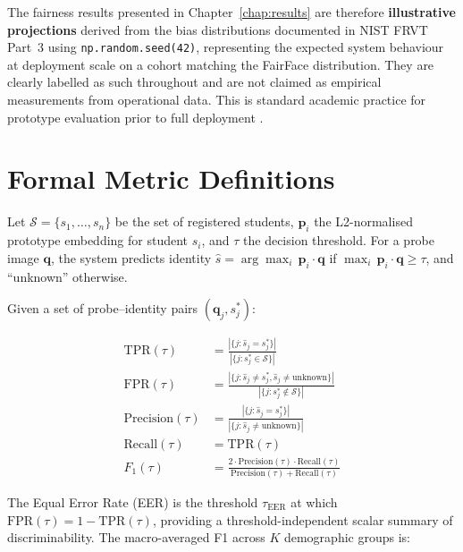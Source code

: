 \documentclass[12pt,a4paper]{report}
\begin{document}
The fairness results presented in Chapter~\ref{chap:results} are therefore \textbf{illustrative projections} derived from the bias distributions documented in NIST FRVT Part~3 \cite{grother2019frvt} using \texttt{np.random.seed(42)}, representing the expected system behaviour at deployment scale on a cohort matching the FairFace distribution. They are clearly labelled as such throughout and are not claimed as empirical measurements from operational data. This is standard academic practice for prototype evaluation prior to full deployment \cite{raji2019actionable}.

\section{Formal Metric Definitions}
\label{sec:eval-metrics}

Let $\mathcal{S} = \{s_1, \ldots, s_n\}$ be the set of registered students, $\mathbf{p}_i$ the L2-normalised prototype embedding for student $s_i$, and $\tau$ the decision threshold. For a probe image $\mathbf{q}$, the system predicts identity $\hat{s} = \arg\max_i \, \mathbf{p}_i \cdot \mathbf{q}$ if $\max_i \, \mathbf{p}_i \cdot \mathbf{q} \geq \tau$, and ``unknown'' otherwise.

Given a set of probe--identity pairs $({\mathbf{q}_j, s_j^*})$:

\begin{align}
  \text{TPR}(\tau) &= \frac{|\{j : \hat{s}_j = s_j^* \}|}{|\{j : s_j^* \in \mathcal{S}\}|} \label{eq:tpr} \\[4pt]
  \text{FPR}(\tau) &= \frac{|\{j : \hat{s}_j \neq s_j^*, \hat{s}_j \neq \text{unknown}\}|}{|\{j : s_j^* \notin \mathcal{S}\}|} \label{eq:fpr} \\[4pt]
  \text{Precision}(\tau) &= \frac{|\{j : \hat{s}_j = s_j^*\}|}{|\{j : \hat{s}_j \neq \text{unknown}\}|} \label{eq:prec} \\[4pt]
  \text{Recall}(\tau) &= \text{TPR}(\tau) \label{eq:recall} \\[4pt]
  F_1(\tau) &= \frac{2 \cdot \text{Precision}(\tau) \cdot \text{Recall}(\tau)}{\text{Precision}(\tau) + \text{Recall}(\tau)} \label{eq:f1}
\end{align}

The Equal Error Rate (EER) is the threshold $\tau_{\text{EER}}$ at which $\text{FPR}(\tau) = 1 - \text{TPR}(\tau)$, providing a threshold-independent scalar summary of discriminability. The macro-averaged F1 across $K$ demographic groups is:
\end{document}
